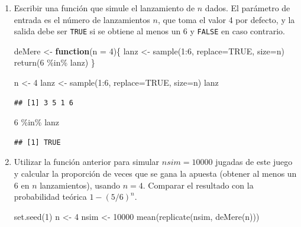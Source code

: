 \documentclass[
]{book}
\newenvironment{Shaded}{\begin{snugshade}}{\end{snugshade}}
\newcommand{\AttributeTok}[1]{\textcolor[rgb]{0.77,0.63,0.00}{#1}}
\newcommand{\ConstantTok}[1]{\textcolor[rgb]{0.00,0.00,0.00}{#1}}
\newcommand{\ControlFlowTok}[1]{\textcolor[rgb]{0.13,0.29,0.53}{\textbf{#1}}}
\newcommand{\DecValTok}[1]{\textcolor[rgb]{0.00,0.00,0.81}{#1}}
\newcommand{\FunctionTok}[1]{\textcolor[rgb]{0.00,0.00,0.00}{#1}}
\newcommand{\NormalTok}[1]{#1}
\newcommand{\OtherTok}[1]{\textcolor[rgb]{0.56,0.35,0.01}{#1}}
\newcommand{\SpecialCharTok}[1]{\textcolor[rgb]{0.00,0.00,0.00}{#1}}
\theoremstyle{break}
\theoremstyle{definition}
\theoremstyle{definition}
\theoremstyle{definition}
\theoremstyle{definition}
\theoremstyle{remark}
\begin{document}
\begin{enumerate}
\def\labelenumi{\alph{enumi})}
\item
  Escribir una función que simule el lanzamiento de \(n\) dados. El
  parámetro de entrada es el número de lanzamientos \(n\), que toma
  el valor 4 por defecto, y la salida debe ser \texttt{TRUE} si se
  obtiene al menos un 6 y \texttt{FALSE} en caso contrario.

\begin{Shaded}
\begin{Highlighting}[]
\NormalTok{deMere }\OtherTok{\textless{}{-}} \ControlFlowTok{function}\NormalTok{(}\AttributeTok{n =} \DecValTok{4}\NormalTok{)\{}
\NormalTok{  lanz }\OtherTok{\textless{}{-}} \FunctionTok{sample}\NormalTok{(}\DecValTok{1}\SpecialCharTok{:}\DecValTok{6}\NormalTok{, }\AttributeTok{replace=}\ConstantTok{TRUE}\NormalTok{, }\AttributeTok{size=}\NormalTok{n)}
  \FunctionTok{return}\NormalTok{(}\DecValTok{6} \SpecialCharTok{\%in\%}\NormalTok{ lanz)}
\NormalTok{\}}

\NormalTok{n }\OtherTok{\textless{}{-}} \DecValTok{4}
\NormalTok{lanz }\OtherTok{\textless{}{-}} \FunctionTok{sample}\NormalTok{(}\DecValTok{1}\SpecialCharTok{:}\DecValTok{6}\NormalTok{, }\AttributeTok{replace=}\ConstantTok{TRUE}\NormalTok{, }\AttributeTok{size=}\NormalTok{n)}
\NormalTok{lanz}
\end{Highlighting}
\end{Shaded}

\begin{verbatim}
## [1] 3 5 1 6
\end{verbatim}

\begin{Shaded}
\begin{Highlighting}[]
\DecValTok{6} \SpecialCharTok{\%in\%}\NormalTok{ lanz}
\end{Highlighting}
\end{Shaded}

\begin{verbatim}
## [1] TRUE
\end{verbatim}
\item
  Utilizar la función anterior para simular \(nsim=10000\) jugadas
  de este juego y calcular la proporción de veces que se gana la
  apuesta (obtener al menos un 6 en \(n\) lanzamientos), usando
  \(n=4\). Comparar el resultado con la probabilidad teórica
  \(1-(5/6)^{n}\).

\begin{Shaded}
\begin{Highlighting}[]
\FunctionTok{set.seed}\NormalTok{(}\DecValTok{1}\NormalTok{)}
\NormalTok{n }\OtherTok{\textless{}{-}} \DecValTok{4}
\NormalTok{nsim }\OtherTok{\textless{}{-}} \DecValTok{10000}
\FunctionTok{mean}\NormalTok{(}\FunctionTok{replicate}\NormalTok{(nsim, }\FunctionTok{deMere}\NormalTok{(n)))}
\end{Highlighting}
\end{Shaded}


\end{enumerate}
\end{document}
